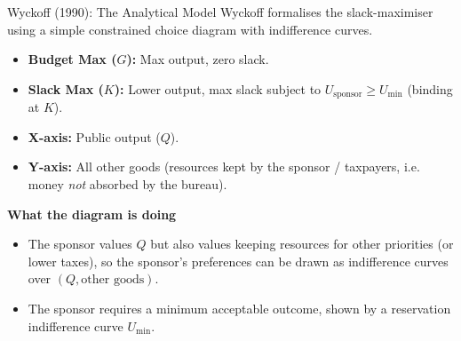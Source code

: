 \documentclass[10pt]{beamer}
\begin{document}
\begin{frame}[allowframebreaks]{Wyckoff (1990): The Analytical Model}
Wyckoff formalises the slack-maximiser using a simple constrained choice diagram with indifference curves.


\begin{itemize}
\item \textbf{Budget Max ($G$):} Max output, zero slack.
\item \textbf{Slack Max ($K$):} Lower output, max slack subject to $U_{\text{sponsor}} \ge U_{\min}$ (binding at $K$).
\end{itemize}


\begin{itemize}
\item \textbf{X-axis:} Public output ($Q$).
\item \textbf{Y-axis:} All other goods (resources kept by the sponsor / taxpayers, i.e. money \emph{not} absorbed by the bureau).
\end{itemize}

\textbf{What the diagram is doing}
\begin{itemize}
\item The sponsor values $Q$ but also values keeping resources for other priorities (or lower taxes), so the sponsor’s preferences can be drawn as indifference curves over $(Q,\text{other goods})$.
\item The sponsor requires a minimum acceptable outcome, shown by a reservation indifference curve $U_{\min}$.
\end{itemize}


\end{frame}
\end{document}
